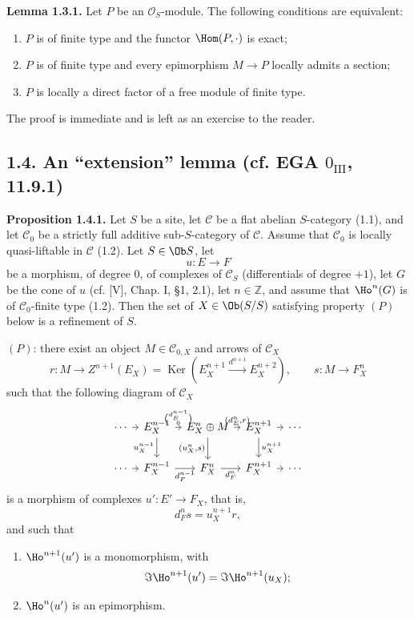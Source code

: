 \documentclass[11pt]{article}
\providecommand{\Ker}{\operatorname{Ker}}
\begin{document}
\textbf{Lemma 1.3.1.} Let \(P\) be an \(\mathcal O_S\)-module. The following conditions are equivalent:
\begin{enumerate}[label=(\roman*)]
\item \(P\) is of finite type and the functor \(\Hom(P,\cdot)\) is exact;
\item \(P\) is of finite type and every epimorphism \(M\to P\) locally admits a section;
\item \(P\) is locally a direct factor of a free module of finite type.
\end{enumerate}
The proof is immediate and is left as an exercise to the reader.

\subsection*{1.4. An ``extension'' lemma (cf. EGA \(0_{\mathrm{III}}\), 11.9.1)}

\textbf{Proposition 1.4.1.} Let \(S\) be a site, let \(\mathcal C\) be a flat abelian \(S\)-category (1.1), and let \(\mathcal C_0\) be a strictly full additive sub-\(S\)-category of \(\mathcal C\). Assume that \(\mathcal C_0\) is locally quasi-liftable in \(\mathcal C\) (1.2). Let \(S\in\Ob S\), let
\[
  u:E\longrightarrow F
\]
be a morphism, of degree \(0\), of complexes of \(\mathcal C_S\) (differentials of degree \(+1\)), let \(G\) be the cone of \(u\) (cf. [V], Chap. I, §1, 2.1), let \(n\in\mathbb Z\), and assume that \(\Ho^n(G)\) is of \(\mathcal C_0\)-finite type (1.2). Then the set of \(X\in\Ob(S/S)\) satisfying property \((P)\) below is a refinement of \(S\).

\((P)\): there exist an object \(M\in\mathcal C_{0,X}\) and arrows of \(\mathcal C_X\)
\[
  r:M\longrightarrow Z^{n+1}(E_X)=
  \Ker\!\left(E_X^{n+1}\xrightarrow{d^{n+1}}E_X^{n+2}\right),
  \qquad
  s:M\longrightarrow F_X^n
\]
such that the following diagram of \(\mathcal C_X\)
\[
\begin{tikzcd}[column sep=tiny]
\cdots \arrow[r] & E_X^{n-1}
 \arrow[r,"{\binom{d_E^{n-1}}{0}}"]
 \arrow[d,"u_X^{n-1}"'] &
E_X^n\oplus M
 \arrow[r,"{(d_E^n,r)}"]
 \arrow[d,"{(u_X^n,s)}"'] &
E_X^{n+1} \arrow[r] \arrow[d,"u_X^{n+1}"] &
\cdots\\
\cdots \arrow[r] & F_X^{n-1} \arrow[r,"d_F^{n-1}"'] &
F_X^n \arrow[r,"d_F^n"'] &
F_X^{n+1} \arrow[r] &
\cdots
\end{tikzcd}
\]
is a morphism of complexes \(u':E'\to F_X\), that is,
\[
  d_F^n s=u_X^{n+1}r,
\]
and such that
\begin{enumerate}[label=(\roman*)]
\item \(\Ho^{n+1}(u')\) is a monomorphism, with
\[
  \Im\Ho^{n+1}(u')=\Im\Ho^{n+1}(u_X);
\]
\item \(\Ho^n(u')\) is an epimorphism.
\end{enumerate}
\end{document}
